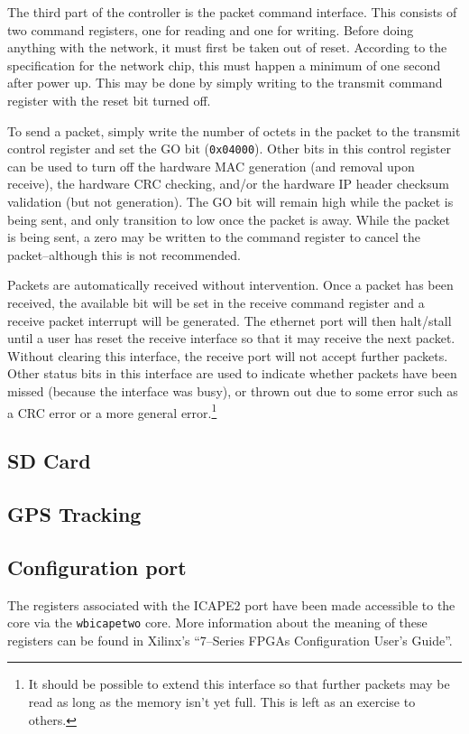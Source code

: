 \documentclass{gqtekspec}
\begin{document}
The third part of the controller is the packet command interface.  This
consists of two command registers, one for reading and one for writing.
Before doing anything with the network, it must first be taken out of 
reset.  According to the specification for the network chip, this must
happen a minimum of one second after power up.  This may be done by simply
writing to the transmit command register with the reset bit turned off.

To send a packet, simply write the number of octets in the packet to the
transmit control register and set the GO bit ({\tt 0x04000}).  Other bits
in this control register can be used to turn off the hardware MAC generation
(and removal upon receive), the hardware CRC checking, and/or the hardware
IP header checksum validation (but not generation).  The GO bit will remain
high while the packet is being sent, and only transition to low once the
packet is away.  While the packet is being sent, a zero may be written to the
command register to cancel the packet--although this is not recommended.

Packets are automatically received without intervention.  Once a packet has been
received, the available bit will be set in the receive command register and
a receive packet interrupt will be generated.  The ethernet port will then
halt/stall until a user has reset the receive interface so that it may
receive the next packet.  Without clearing this interface, the receive port
will not accept further packets.  Other status bits in this interface are
used to indicate whether packets have been missed (because the interface was
busy), or thrown out due to some error such as a CRC error or a more general
error.\footnote{It should be possible to extend this interface so that further
packets may be read as long as the memory isn't yet full.  This is left as an
exercise to others.}

\subsection{SD Card}
\subsection{GPS Tracking}
\subsection{Configuration port}

The registers associated with the ICAPE2 port have been made accessible
to the core via the {\tt wbicapetwo} core.  More information about the meaning
of these registers can be found in Xilinx's ``7--Series FPGAs Configuration
User's Guide''.  
\end{document}
